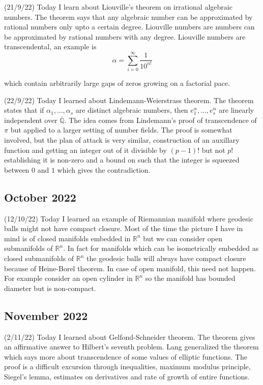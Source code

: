 \documentclass[12pt,a4paper]{article}
\newcommand{\R}{\mathbb{R}}
\newcommand{\Q}{\mathbb{Q}}
\begin{document}
(21/9/22) Today I learn about Liouville's theorem on irrational algebraic numbers. The theorem says that any algebraic number can be approximated by rational numbers only upto a certain degree. Liouville numbers are numbers can be approximated by rational numbers with any degree. Liouville numbers are transcendental, an example is 
	\[ \alpha = \sum_{i = 0}^{\infty} \frac{1}{10^{n!}} \]
	
which contain arbitrarily large gaps of zeros growing on a factorial pace.
	
(22/9/22) Today I learned about Lindemann-Weierstrass theorem. 
The theorem states that if $\alpha_1, \ldots, \alpha_s$ are distinct algebraic numbers, then $e^\alpha_1, \ldots, e^\alpha_s$ are linearly independent over $\overline{\Q}$. 
The idea comes from Lindemann's proof of transcendence of $\pi$ but applied to a larger setting of number fields. The proof is somewhat involved, but the plan of attack is very similar, construction of an auxillary function and getting an integer out of it divisible by $(p-1)!$ but not $p!$ establishing it is non-zero and a bound on such that the integer is squeezed between $0$ and $1$ which gives the contradiction.
   
\subsection*{October 2022}

\quad (12/10/22) Today I learned an example of Riemannian manifold where geodesic balls might not have compact closure. Most of the time the picture I have in mind is of closed manifolds embedded in $ \R^{n} $ but we can consider open submanifolds of $ \R^{n} $. In fact for manifolds which can be isometrically embedded as closed submanifolds of $ \R^{n} $ the geodesic balls will always have compact closure because of Heine-Borel theorem. In case of open manifold, this need not happen. 
For example consider an open cylinder in $ \R^{n} $ so the manifold has bounded diameter but is non-compact.

\subsection*{November 2022}

\quad (2/11/22) Today I learned about Gelfond-Schneider theorem. The theorem gives an affirmative answer to Hilbert's seventh problem. Lang generalized the theorem which says more about transcendence of some values of elliptic functions. The proof is a difficult excursion through inequalities, maximum modulus principle, Siegel's lemma, estimates on derivatives and rate of growth of entire functions.
\end{document}
